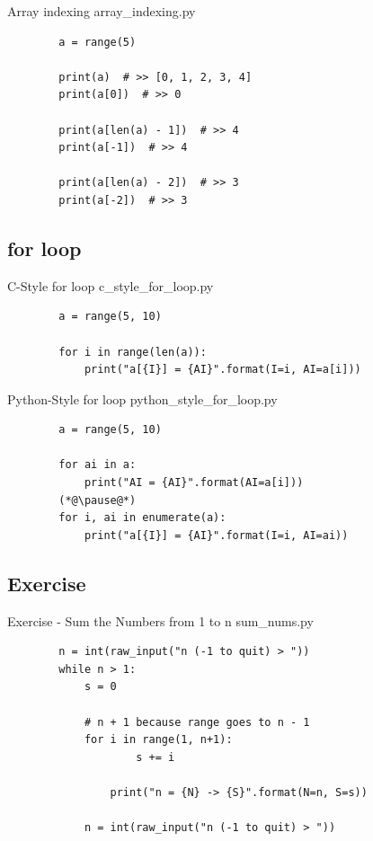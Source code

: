 \documentclass[11pt]{beamer}
\begin{document}
\begin{frame}[fragile]{Array indexing}
	array\_indexing.py
	\begin{lstlisting}
		a = range(5)

		print(a)  # >> [0, 1, 2, 3, 4]
		print(a[0])  # >> 0

		print(a[len(a) - 1])  # >> 4
		print(a[-1])  # >> 4

		print(a[len(a) - 2])  # >> 3
		print(a[-2])  # >> 3
	\end{lstlisting}
\end{frame}

\subsection{for loop}
\begin{frame}[fragile]{C-Style for loop}
	c\_style\_for\_loop.py
	\begin{lstlisting}
		a = range(5, 10)

		for i in range(len(a)):
		    print("a[{I}] = {AI}".format(I=i, AI=a[i]))
	\end{lstlisting}
\end{frame}

\begin{frame}[fragile]{Python-Style for loop}
	python\_style\_for\_loop.py
	\begin{lstlisting}
		a = range(5, 10)

		for ai in a:
		    print("AI = {AI}".format(AI=a[i]))
		(*@\pause@*)
		for i, ai in enumerate(a):
		    print("a[{I}] = {AI}".format(I=i, AI=ai))
	\end{lstlisting}
\end{frame}

\subsection{Exercise}
\begin{frame}[fragile]{Exercise - Sum the Numbers from 1 to n}
	sum\_nums.py
	\pause
	\begin{lstlisting}
		n = int(raw_input("n (-1 to quit) > "))
		while n > 1:
		    s = 0

		    # n + 1 because range goes to n - 1
		    for i in range(1, n+1):
		    	    s += i

		    	print("n = {N} -> {S}".format(N=n, S=s))

		    n = int(raw_input("n (-1 to quit) > "))
	\end{lstlisting}
\end{frame}
\end{document}
